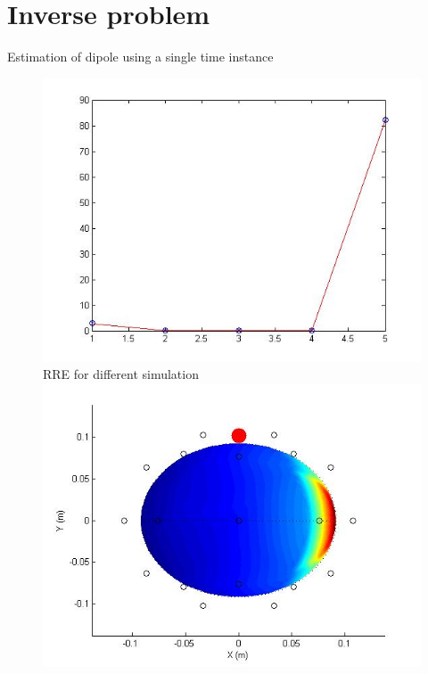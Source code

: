 \documentclass[t,12pt,english
\ifx\beamermode\undefined\else,\beamermode\fi
]{beamer}
\begin{document}
\section{Inverse problem}

\begin{frame}{Estimation of dipole using a single time instance}

\begin{figure}[!htbp]
%
\centering
\includegraphics[width=1\textwidth]{13.jpg}\\
\tiny{RRE for different simulation}
\endminipage\hfill
{}%
\centering
\includegraphics[width=1\textwidth]{14.jpg}


\end{figure}
\end{frame}
\end{document}
